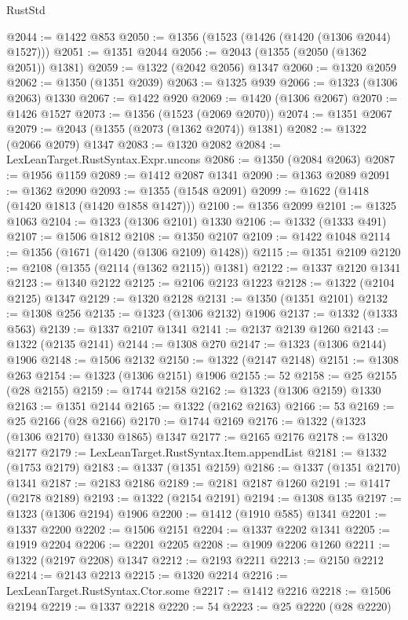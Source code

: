 \begin{lexlean}{RustStd}
\begin{coremodule}
@2044 := @1422 @853
@2050 := @1356 (@1523 (@1426 (@1420 (@1306 @2044) @1527)))
@2051 := @1351 @2044
@2056 := @2043 (@1355 (@2050 (@1362 @2051)) @1381)
@2059 := @1322 (@2042 @2056) @1347
@2060 := @1320 @2059
@2062 := @1350 (@1351 @2039)
@2063 := @1325 @939
@2066 := @1323 (@1306 @2063) @1330
@2067 := @1422 @920
@2069 := @1420 (@1306 @2067)
@2070 := @1426 @1527
@2073 := @1356 (@1523 (@2069 @2070))
@2074 := @1351 @2067
@2079 := @2043 (@1355 (@2073 (@1362 @2074)) @1381)
@2082 := @1322 (@2066 @2079) @1347
@2083 := @1320 @2082
@2084 := LexLeanTarget.RustSyntax.Expr.uncons
@2086 := @1350 (@2084 @2063)
@2087 := @1956 @1159
@2089 := @1412 @2087 @1341
@2090 := @1363 @2089
@2091 := @1362 @2090
@2093 := @1355 (@1548 @2091)
@2099 := @1622 (@1418 (@1420 @1813 (@1420 @1858 @1427)))
@2100 := @1356 @2099
@2101 := @1325 @1063
@2104 := @1323 (@1306 @2101) @1330
@2106 := @1332 (@1333 @491)
@2107 := @1506 @1812
@2108 := @1350 @2107
@2109 := @1422 @1048
@2114 := @1356 (@1671 (@1420 (@1306 @2109) @1428))
@2115 := @1351 @2109
@2120 := @2108 (@1355 (@2114 (@1362 @2115)) @1381)
@2122 := @1337 @2120 @1341
@2123 := @1340 @2122
@2125 := @2106 @2123 @1223
@2128 := @1322 (@2104 @2125) @1347
@2129 := @1320 @2128
@2131 := @1350 (@1351 @2101)
@2132 := @1308 @256
@2135 := @1323 (@1306 @2132) @1906
@2137 := @1332 (@1333 @563)
@2139 := @1337 @2107 @1341
@2141 := @2137 @2139 @1260
@2143 := @1322 (@2135 @2141)
@2144 := @1308 @270
@2147 := @1323 (@1306 @2144) @1906
@2148 := @1506 @2132
@2150 := @1322 (@2147 @2148)
@2151 := @1308 @263
@2154 := @1323 (@1306 @2151) @1906
@2155 := 52
@2158 := @25 @2155 (@28 @2155)
@2159 := @1744 @2158
@2162 := @1323 (@1306 @2159) @1330
@2163 := @1351 @2144
@2165 := @1322 (@2162 @2163)
@2166 := 53
@2169 := @25 @2166 (@28 @2166)
@2170 := @1744 @2169
@2176 := @1322 (@1323 (@1306 @2170) @1330 @1865) @1347
@2177 := @2165 @2176
@2178 := @1320 @2177
@2179 := LexLeanTarget.RustSyntax.Item.appendList
@2181 := @1332 (@1753 @2179)
@2183 := @1337 (@1351 @2159)
@2186 := @1337 (@1351 @2170) @1341
@2187 := @2183 @2186
@2189 := @2181 @2187 @1260
@2191 := @1417 (@2178 @2189)
@2193 := @1322 (@2154 @2191)
@2194 := @1308 @135
@2197 := @1323 (@1306 @2194) @1906
@2200 := @1412 (@1910 @585) @1341
@2201 := @1337 @2200
@2202 := @1506 @2151
@2204 := @1337 @2202 @1341
@2205 := @1919 @2204
@2206 := @2201 @2205
@2208 := @1909 @2206 @1260
@2211 := @1322 (@2197 @2208) @1347
@2212 := @2193 @2211
@2213 := @2150 @2212
@2214 := @2143 @2213
@2215 := @1320 @2214
@2216 := LexLeanTarget.RustSyntax.Ctor.some
@2217 := @1412 @2216
@2218 := @1506 @2194
@2219 := @1337 @2218
@2220 := 54
@2223 := @25 @2220 (@28 @2220)

\end{coremodule}
\end{lexlean}
